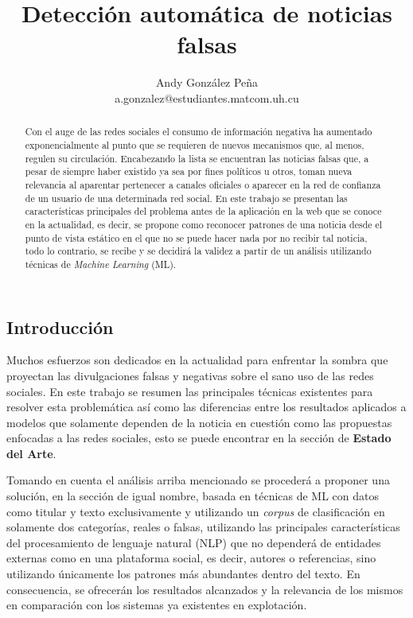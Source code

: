 \documentclass{llncs}
\begin{document}
\title{Detecci\'on autom\'atica de noticias falsas}

\author{Andy Gonz\'alez Pe\~na \\ a.gonzalez@estudiantes.matcom.uh.cu}

\maketitle


\begin{multicols}{2}[]

\begin{abstract}

Con el auge de las redes sociales el consumo de informaci\'on negativa ha aumentado exponencialmente al punto que se requieren de nuevos mecanismos
que, al menos, regulen su circulaci\'on. Encabezando la lista se encuentran las noticias falsas que, a pesar de siempre haber existido ya sea por fines pol\'iticos
u otros, toman nueva relevancia al aparentar pertenecer a canales oficiales o aparecer en la red de confianza de un usuario de una determinada red social.
En este trabajo se presentan las caracter\'isticas principales del problema antes de la aplicaci\'on en la web que se conoce en la actualidad, es decir, se propone
como reconocer patrones de una noticia desde el punto de vista est\'atico en el que no se puede hacer nada por no recibir tal noticia, todo lo contrario, se recibe
y se decidir\'a la validez a partir de un an\'alisis utilizando t\'ecnicas de \textit{Machine Learning} (ML).

\end{abstract}


\section{Introducci\'on}\label{sec:Introduction}

Muchos esfuerzos son dedicados en la actualidad para enfrentar la sombra que proyectan las divulgaciones falsas y negativas sobre el sano uso de las redes sociales. 
En este trabajo se resumen las principales t\'ecnicas existentes para resolver esta problem\'atica as\'i como las diferencias entre los resultados aplicados a modelos que 
solamente dependen de la noticia en cuesti\'on como las propuestas enfocadas a las redes sociales, esto se puede encontrar en la secci\'on de \textbf{Estado del Arte}.

Tomando en cuenta el an\'alisis arriba mencionado se proceder\'a a proponer una soluci\'on, en la secci\'on de igual nombre, basada en t\'ecnicas de ML con datos como
titular y texto exclusivamente y utilizando un \textit{corpus} de clasificaci\'on en solamente dos categor\'ias, reales o falsas, utilizando las principales caracter\'isticas del
procesamiento de lenguaje natural (NLP) que no depender\'a de entidades externas como en una plataforma social, es decir, autores o referencias, sino utilizando \'unicamente 
los patrones m\'as abundantes dentro del texto. En consecuencia, se ofrecer\'an los resultados alcanzados y la relevancia de los mismos en comparaci\'on con los sistemas 
ya existentes en explotaci\'on.


\end{multicols}
\end{document}
